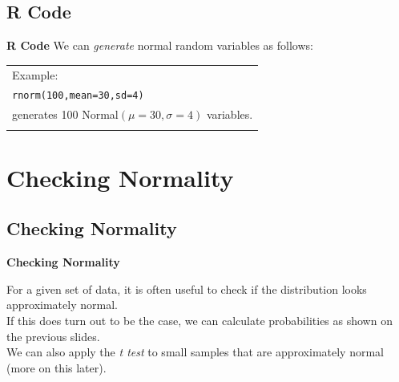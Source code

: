 \documentclass[compress]{beamer}        %
\makeatletter
\newcommand{\tcb}{\textcolor{beamer@blendedblue}}
\makeatother
\begin{document}
\subsection{R Code}
\begin{frame}{\bf \tcb{R Code}}
We can \emph{generate} normal random variables as follows:\\[0.5cm]

\begin{tabular}{|l|}
\hline
Example: \\[0.2cm]
\texttt{rnorm(100,mean=30,sd=4)} \\
generates 100 Normal$(\mu=30,\sigma=4)$ variables.\\
\hline
\multicolumn{1}{c}{}\\[0.2cm]
\end{tabular}


\end{frame}



\section{Checking Normality}
\subsection{Checking Normality}
\begin{frame}{\bf \tcb{Checking Normality}}

For a given set of data, it is often useful to check if the distribution looks approximately normal.\\[0.8cm]

If this does turn out to be the case, we can calculate probabilities as shown on the previous slides.\\[0.8cm]

We can also apply the \emph{t test} to small samples that are approximately normal (more on this later).

\end{frame}
\end{document}
